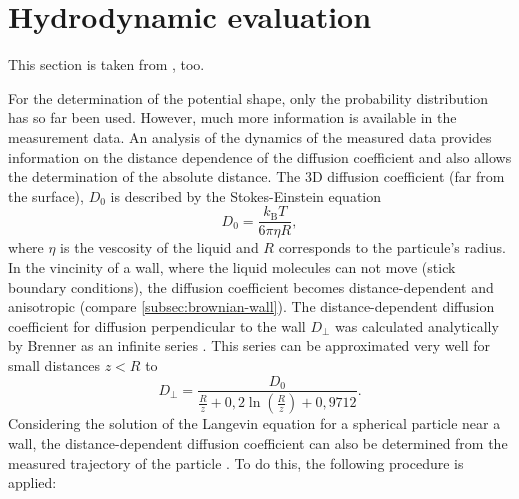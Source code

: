 \documentclass[.../bericht]{subfilies}
\begin{document}
      \section{Hydrodynamic evaluation}
      \label{sec:hydrodynamic}

        This section is taken from \cite{anleitung}, too.

        For the determination of the potential shape, only the probability distribution has so far been used. However, much more information is available in the measurement data. An analysis of the dynamics of the measured data provides information on the distance dependence of the diffusion coefficient and also allows the determination of the absolute distance. The 3D diffusion coefficient (far from the surface), $D_0$ is described by the Stokes-Einstein equation
        \begin{equation*}
          D_0=\frac{k_\mathrm{B}T}{6\pi\eta R},
        \end{equation*}
        where $\eta$ is the vescosity of the liquid and $R$ corresponds to the particule's radius. In the vincinity of a wall, where the liquid molecules can not move (stick boundary conditions), the diffusion coefficient becomes distance-dependent and anisotropic (compare \cref{subsec:brownian-wall}). The distance-dependent diffusion coefficient for diffusion perpendicular to the wall $D_\perp$ was calculated analytically by Brenner as an infinite series \cite{2}. This series can be approximated very well for small distances $z<R$ to
        \begin{equation}
          D_\perp = \frac{D_0}{\frac{R}{z}+0,2\ln\left(\frac{R}{z}\right) + 0,9712}.
          \label{eq:d-perp-sheet}
        \end{equation}
        Considering the solution of the Langevin equation for a spherical particle near a wall, the distance-dependent diffusion coefficient can also be determined from the measured trajectory of the particle \cite{4}. To do this, the following procedure is applied:
        \medskip
\end{document}
